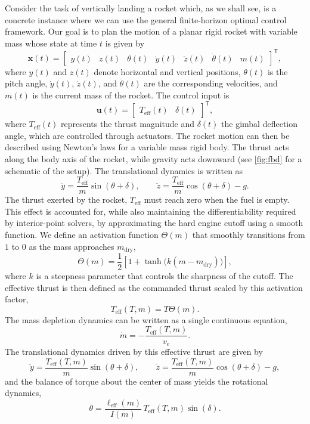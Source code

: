\documentclass[12pt]{article}
\def\x{\mathbf{x}}
\def\u{\mathbf{u}}
\def\T{\mathsf{T}}
\def\eff{\mathrm{eff}}
\begin{document}
Consider the task of vertically landing a rocket which, as we shall see, is a concrete instance where we can use the general finite-horizon optimal control framework. Our goal is to plan the motion of a planar rigid rocket with variable mass whose state at time $t$ is given by
\[
\x(t) =
\begin{bmatrix}
y(t) & z(t) & \theta(t) & \dot y(t) & \dot z(t) & \dot \theta(t) & m(t)
\end{bmatrix}^\T,
\]
where $y(t)$ and $z(t)$ denote horizontal and vertical positions, $\theta(t)$ is the pitch angle, $\dot y(t)$, $\dot z(t)$, and $\dot\theta(t)$ are the corresponding velocities, and $m(t)$ is the current mass of the rocket. The control input is
\[
\u(t) =
\begin{bmatrix}
T_{\eff}(t) & \delta(t)
\end{bmatrix}^\T,
\]
where $T_{\eff}(t)$ represents the thrust magnitude and $\delta(t)$ the gimbal deflection angle, which are controlled through actuators. The rocket motion can then be described using Newton's laws for a variable mass rigid body. The thrust acts along the body axis of the rocket, while gravity acts downward (see \ref{fig:fbd} for a schematic of the setup). The translational dynamics is written as
\[
\ddot y = \frac{T_{\mathrm{eff}}}{m} \sin(\theta + \delta),
\qquad
\ddot z = \frac{T_{\eff}}{m} \cos(\theta + \delta) - g.
\]
The thrust exerted by the rocket, $T_{\eff}$ must reach zero when the fuel is empty. This effect is accounted for, while also maintaining the differentiability required by interior-point solvers, by approximating the hard engine cutoff using a smooth function. We define an activation function $\Theta(m)$ that smoothly transitions from $1$ to $0$ as the mass approaches $m_{\text{dry}}$,
\[
\Theta(m) = \frac{1}{2} \left[ 1 + \tanh\big(k (m - m_{\text{dry}})\big) \right],
\]
where $k$ is a steepness parameter that controls the sharpness of the cutoff. The effective thrust is then defined as the commanded thrust scaled by this activation factor,
\[
T_{\text{eff}}(T, m) = T \Theta(m).
\]
The mass depletion dynamics can be written as a single continuous equation,
\[
\dot m = - \frac{T_{\text{eff}}(T, m)}{v_e}.
\]
The translational dynamics driven by this effective thrust are given by
\[
\ddot y = \frac{T_{\text{eff}}(T, m)}{m} \sin(\theta + \delta),
\qquad
\ddot z = \frac{T_{\text{eff}}(T, m)}{m} \cos(\theta + \delta) - g,
\]
and the balance of torque about the center of mass yields the rotational dynamics,
\[
\ddot{\theta} = \frac{\ell_{\text{eff}}(m)}{I(m)} \, T_{\text{eff}}(T, m) \sin(\delta).
\]
\end{document}

